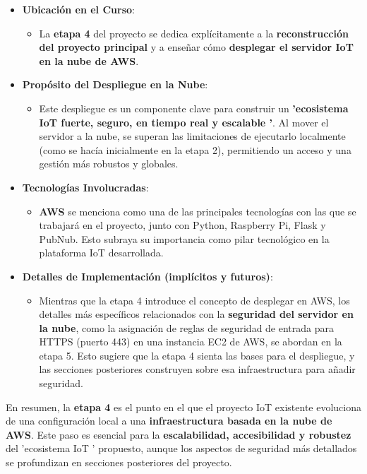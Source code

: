\documentclass{report}
\begin{document}
\begin{itemize}
    \item \textbf{Ubicación en el Curso}:
    \begin{itemize}
        \item La \textbf{etapa 4} del proyecto se dedica explícitamente a la \textbf{reconstrucción del proyecto principal} y a enseñar cómo 
        \textbf{desplegar el servidor IoT en la nube de AWS}.
    \end{itemize}

    \item \textbf{Propósito del Despliegue en la Nube}:
    \begin{itemize}
        \item Este despliegue es un componente clave para construir un \textbf{ 'ecosistema IoT fuerte, seguro, en tiempo real y escalable '}. 
        Al mover el servidor a la nube, se superan las limitaciones de ejecutarlo localmente (como se hacía inicialmente en la etapa 2), 
        permitiendo un acceso y una gestión más robustos y globales.
    \end{itemize}

    \item \textbf{Tecnologías Involucradas}:
    \begin{itemize}
        \item \textbf{AWS} se menciona como una de las principales tecnologías con las que se trabajará en el proyecto, junto con Python, Raspberry Pi, 
        Flask y PubNub. Esto subraya su importancia como pilar tecnológico en la plataforma IoT desarrollada.
    \end{itemize}

    \item \textbf{Detalles de Implementación (implícitos y futuros)}:
    \begin{itemize}
        \item Mientras que la etapa 4 introduce el concepto de desplegar en AWS, los detalles más específicos relacionados con la 
        \textbf{seguridad del servidor en la nube}, como la asignación de reglas de seguridad de entrada para HTTPS (puerto 443) en una instancia EC2 
        de AWS, se abordan en la etapa 5. Esto sugiere que la etapa 4 sienta las bases para el despliegue, y las secciones posteriores construyen 
        sobre esa infraestructura para añadir seguridad.
    \end{itemize}
\end{itemize}
En resumen, la \textbf{etapa 4} es el punto en el que el proyecto IoT existente evoluciona de una configuración local a una \textbf{infraestructura 
basada en la nube de AWS}. Este paso es esencial para la \textbf{escalabilidad, accesibilidad y robustez} del  'ecosistema IoT ' propuesto, aunque los 
aspectos de seguridad más detallados se profundizan en secciones posteriores del proyecto.
\end{document}
